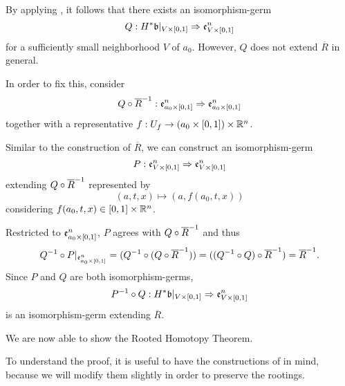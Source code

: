 \begin{myproof}
    By applying ,
    it follows that there exists an isomorphism-germ
    \[ \germdef{Q}{\ind{H}\bb[\cyl{V}]}{\be{\cyl{V}}} \]
    for a sufficiently small neighborhood $V$ of $a_0$.
    However, $Q$ does not extend $\overline{R}$ in general.

    In order to fix this, consider
    \[ Q \circ \overline{R}^{-1}: \mathfrak{e}^{n}_{a_0 \times{} [0, 1]} \Rightarrow{} \mathfrak{e}^{n}_{a_0 \times{} [0, 1]} \]
    together with a representative $f: U_f \to (a_0 \times{} [0, 1]) \times \mathbb{R}^n$.

    Similar to the construction of $\overline{R}$, we can construct an isomorphism-germ
    \[ P: \mathfrak{e}^{n}_{V \times{} [0, 1]} \Rightarrow{} \mathfrak{e}^{n}_{V \times{} [0, 1]} \]
    extending $Q \circ \overline{R}^{-1}$ represented by
    \[ (a, t, x) \mapsto (a, f(a_0, t, x)) \]
    considering $f(a_0, t, x) \in [0, 1] \times \mathbb{R}^n$.

    Restricted to $\mathfrak{e}^{n}_{a_0 \times{} [0, 1]}$, $P$ agrees with $Q \circ \overline{R}^{-1}$ and thus
    \[
        Q^{-1} \circ P\vert_{\mathfrak{e}^{n}_{a_0 \times{} [0, 1]}}
        = (Q^{-1} \circ (Q \circ \overline{R}^{-1}))
        = ((Q^{-1} \circ Q) \circ \overline{R}^{-1})
        = \overline{R}^{-1}.
    \]
    Since $P$ and $Q$ are both isomorphism-germs,
    \[ \germdef{\inv{P} \circ Q}{\ind{H}\bb[\cyl{V}]}{\be{\cyl{V}}} \]
    is an isomorphism-germ extending $\overline{R}$.
\end{myproof}

\begin{myparagraph}
    We are now able to show the Rooted Homotopy Theorem.

    To understand the proof,
    it is useful to have the constructions of  in mind,
    because we will modify them slightly in order to preserve the rootings.
\end{myparagraph}

